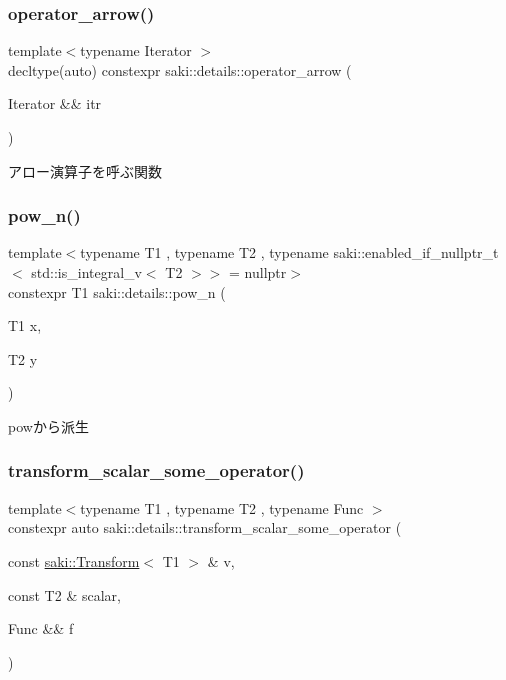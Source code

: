 \subsubsection{\texorpdfstring{operator\+\_\+arrow()}{operator\_arrow()}}
{\footnotesize\ttfamily template$<$typename Iterator $>$ \\
decltype(auto) constexpr saki\+::details\+::operator\+\_\+arrow (\begin{DoxyParamCaption}\item[{Iterator \&\&}]{itr }\end{DoxyParamCaption})}



アロー演算子を呼ぶ関数 

\mbox{\label{namespacesaki_1_1details_a30b4cd78c970618ee2886123c28e4041}} 
\subsubsection{\texorpdfstring{pow\+\_\+n()}{pow\_n()}}
{\footnotesize\ttfamily template$<$typename T1 , typename T2 , typename saki\+::enabled\+\_\+if\+\_\+nullptr\+\_\+t$<$ std\+::is\+\_\+integral\+\_\+v$<$ T2 $>$$>$  = nullptr$>$ \\
constexpr T1 saki\+::details\+::pow\+\_\+n (\begin{DoxyParamCaption}\item[{T1}]{x,  }\item[{T2}]{y }\end{DoxyParamCaption})}



powから派生 

\mbox{\label{namespacesaki_1_1details_a2f5694f4bcf7f45e946384285562521e}} 
\subsubsection{\texorpdfstring{transform\+\_\+scalar\+\_\+some\+\_\+operator()}{transform\_scalar\_some\_operator()}}
{\footnotesize\ttfamily template$<$typename T1 , typename T2 , typename Func $>$ \\
constexpr auto saki\+::details\+::transform\+\_\+scalar\+\_\+some\+\_\+operator (\begin{DoxyParamCaption}\item[{const \mbox{\hyperlink{classsaki_1_1_transform}{saki\+::\+Transform}}$<$ T1 $>$ \&}]{v,  }\item[{const T2 \&}]{scalar,  }\item[{Func \&\&}]{f }\end{DoxyParamCaption})}



